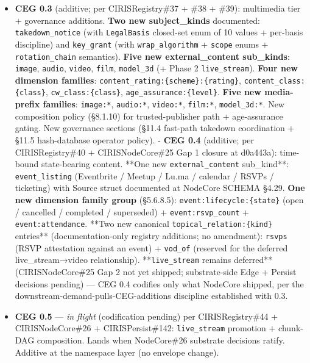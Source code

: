 \documentclass[11pt]{article}
\begin{document}
\begin{itemize}
\item \textbf{CEG 0.3} (additive; per CIRISRegistry\#37 + \#38 + \#39): multimedia tier + governance additions. \textbf{Two new subject\_kinds} documented: \texttt{takedown\_notice} (with \texttt{LegalBasis} closed-set enum of 10 values + per-basis discipline) and \texttt{key\_grant} (with \texttt{wrap\_algorithm} + \texttt{scope} enums + \texttt{rotation\_chain} semantics). \textbf{Five new external\_content sub\_kinds}: \texttt{image}, \texttt{audio}, \texttt{video}, \texttt{film}, \texttt{model\_3d} (+ Phase 2 \texttt{live\_stream}). \textbf{Four new dimension families}: \texttt{content\_rating:\{scheme\}:\{rating\}}, \texttt{content\_class:\{class\}}, \texttt{cw\_class:\{class\}}, \texttt{age\_assurance:\{level\}}. \textbf{Five new media-prefix families}: \texttt{image:*}, \texttt{audio:*}, \texttt{video:*}, \texttt{film:*}, \texttt{model\_3d:*}. New composition policy (§8.1.10) for trusted-publisher path + age-assurance gating. New governance sections (§11.4 fast-path takedown coordination + §11.5 hash-database operator policy). - \textbf{CEG 0.4} (additive; per CIRISRegistry\#40 + CIRISNodeCore\#25 Gap 1 closure at d0a443a): time-bound state-bearing content. **One new \texttt{external\_content} sub\_kind**: \texttt{event\_listing} (Eventbrite / Meetup / Lu.ma / calendar / RSVPs / ticketing) with Source struct documented at NodeCore SCHEMA §4.29. \textbf{One new dimension family group} (§5.6.8.5): \texttt{event:lifecycle:\{state\}} (open / cancelled / completed / superseded) + \texttt{event:rsvp\_count} + \texttt{event:attendance}. **Two new canonical \texttt{topical\_relation:\{kind\}} entries** (documentation-only registry additions; no amendment): \texttt{rsvps} (RSVP attestation against an event) + \texttt{vod\_of} (reserved for the deferred live\_stream→video relationship). **\texttt{live\_stream} remains deferred** (CIRISNodeCore\#25 Gap 2 not yet shipped; substrate-side Edge + Persist decisions pending) — CEG 0.4 codifies only what NodeCore shipped, per the downstream-demand-pulls-CEG-additions discipline established with 0.3.
\item \textbf{CEG 0.5} — \textit{in flight} (codification pending) per CIRISRegistry\#44 + CIRISNodeCore\#26 + CIRISPersist\#142: \texttt{live\_stream} promotion + chunk-DAG composition. Lands when NodeCore\#26 substrate decisions ratify. Additive at the namespace layer (no envelope change).

\end{itemize}
\end{document}
